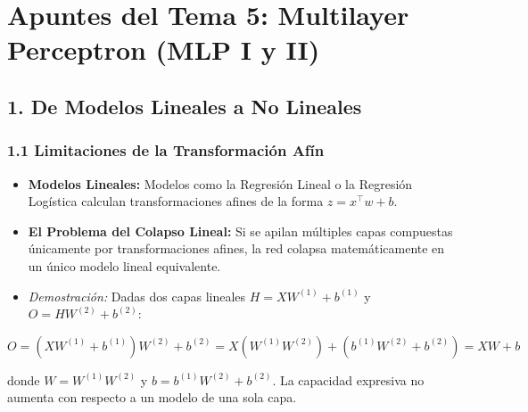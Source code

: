 \documentclass[11pt,oneside]{article}
\begin{document}
\tableofcontents
\clearpage
{}
\section{Apuntes del Tema 5: Multilayer Perceptron (MLP I y II)}

\subsection{1. De Modelos Lineales a No Lineales}

\subsubsection{1.1 Limitaciones de la Transformación Afín}

\begin{itemize}

\item \textbf{Modelos Lineales:} Modelos como la Regresión Lineal o la Regresión Logística calculan transformaciones afines de la forma \(z = x^\top w + b\).

\end{itemize}

\begin{itemize}

\item \textbf{El Problema del Colapso Lineal:} Si se apilan múltiples capas compuestas únicamente por transformaciones afines, la red colapsa matemáticamente en un único modelo lineal equivalente.

\end{itemize}

\begin{itemize}

\item \emph{Demostración:} Dadas dos capas lineales \(H = X W^{(1)} + b^{(1)}\) y \(O = H W^{(2)} + b^{(2)}\):

\end{itemize}

\[O = (X W^{(1)} + b^{(1)}) W^{(2)} + b^{(2)} = X (W^{(1)} W^{(2)}) + (b^{(1)} W^{(2)} + b^{(2)}) = X W + b\]

donde \(W = W^{(1)} W^{(2)}\) y \(b = b^{(1)} W^{(2)} + b^{(2)}\). La capacidad expresiva no aumenta con respecto a un modelo de una sola capa.
\end{document}
